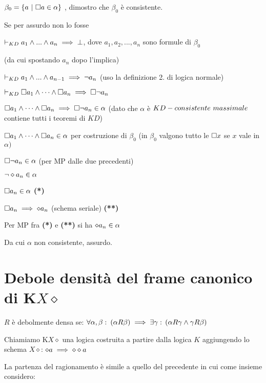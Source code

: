 $\beta_{0}=\{a\ |\ \square a\in\alpha\}$ , dimostro che $\beta_{0}$ è
consistente.

Se per assurdo non lo fosse

$\vdash_{KD}a_{1}\wedge...\wedge a_{n}\implies\bot$, dove $a_{1},a_{2},...,a_{n}$
sono formule di $\beta_{0}$

(da cui spostando $a_{n}$ dopo l'implica)

$\vdash_{KD}a_{1}\wedge...\wedge a_{n-1}\implies\neg a_{n}$ (uso la definizione
2. di logica normale)

$\vdash_{KD}\square a_{1}\wedge\dots\wedge\square a_{n}\implies\square\neg a_{n}$

$\square a_{1}\wedge\dots\wedge\square a_{n}\implies\square\neg a_{n}\in\alpha$ (dato che $\alpha$
è $KD-consistente\ massimale$ contiene tutti i teoremi di $KD$)

$\square a_{1}\wedge\dots\wedge\square a_{n}\in\alpha$ per costruzione di $\beta_{0}$ (in $\beta_{0}$
valgono tutto le $\square x$ se $x$ vale in $\alpha)$

$\square\neg a_{n}\in\alpha$ (per MP dalle due precedenti)

$\neg\diamond a_{n}\in\alpha$

$\square a_{n}\in\alpha$ \textbf{({*})}

$\square a_{n}\implies\diamond a_{n}$ (schema seriale) \textbf{({*}{*})}

Per MP fra \textbf{({*}) }e\textbf{ ({*}{*}) }si ha $\diamond a_{n}\in\alpha$

\noindent \begin{flushleft}
Da cui $\alpha$ non consistente, assurdo. \lightning
\par\end{flushleft}


\section{\noindent Debole densità del frame canonico di K$X\diamond$}

\noindent \begin{flushleft}
$R$ è debolmente densa se: $\forall\alpha,\beta:\:(\alpha R\beta)\implies\exists\gamma:\,(\alpha R\gamma\wedge\gamma R\beta)$
\par\end{flushleft}

Chiamiamo K$X\diamond$ una logica costruita a partire dalla logica
$K$ aggiungendo lo schema $X\diamond$: $\diamond a\implies\diamond\diamond a$

La partenza del ragionamento è simile a quello del precedente in cui
come insieme considero:

